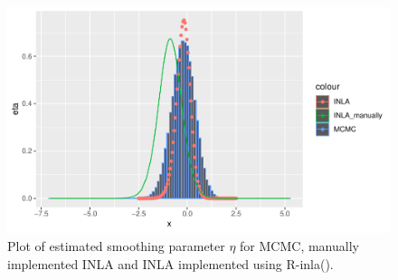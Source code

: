 \begin{figure}[h]
    \centering
    \includegraphics{Images/smoothing_comparison.pdf}
    \caption{Plot of estimated smoothing parameter $\eta$ for MCMC, manually implemented INLA and INLA implemented using R-inla().}
    \label{fig:smoothing_comparison}
\end{figure}
